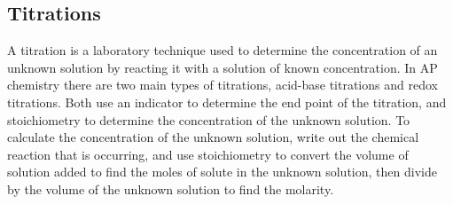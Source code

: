 \subsection{Titrations}
A titration is a laboratory technique used to determine the concentration of an unknown solution by reacting it with a solution of known concentration. In AP chemistry there are two main types of titrations, acid-base titrations and redox titrations. Both use an indicator to determine the end point of the titration, and stoichiometry to determine the concentration of the unknown solution. To calculate the concentration of the unknown solution, write out the chemical reaction that is occurring, and use stoichiometry to convert the volume of solution added to find the moles of solute in the unknown solution, then divide by the volume of the unknown solution to find the molarity.